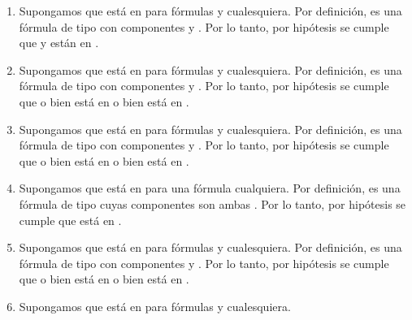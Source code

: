 \begin{isabellebody}
\begin{isamarkuptext}
\begin{demostracion}
  \begin{enumerate}
    \item[\isa{{\isadigit{3}}{\isacharparenright}}] Supongamos que  está en  para fórmulas  y  cualesquiera.
    Por definición,  es una fórmula de tipo \isa{{\isasymalpha}} con componentes  y . 
    Por lo tanto, por hipótesis se cumple que  y  están en .
    \item[\isa{{\isadigit{4}}{\isacharparenright}}] Supongamos que  está en  para fórmulas  y  cualesquiera.
    Por definición,  es una fórmula de tipo \isa{{\isasymbeta}} con componentes  y . 
    Por lo tanto, por hipótesis se cumple que o bien  está en  o bien  está 
    en .
    \item[\isa{{\isadigit{5}}{\isacharparenright}}] Supongamos que  está en  para fórmulas  y  cualesquiera.
    Por definición,  es una fórmula de tipo \isa{{\isasymbeta}} con componentes  y . 
    Por lo tanto, por hipótesis se cumple que o bien  está en  o bien  está 
    en .
    \item[\isa{{\isadigit{6}}{\isacharparenright}}] Supongamos que  está en  para una fórmula  cualquiera.
    Por definición,  es una fórmula de tipo \isa{{\isasymalpha}} cuyas componentes son ambas . 
    Por lo tanto, por hipótesis se cumple que  está en .
    \item[\isa{{\isadigit{7}}{\isacharparenright}}] Supongamos que  está en  para fórmulas  y  cualesquiera.
    Por definición,  es una fórmula de tipo \isa{{\isasymbeta}} con componentes  y . 
    Por lo tanto, por hipótesis se cumple que o bien  está en  o bien  está 
    en .
    \item[\isa{{\isadigit{8}}{\isacharparenright}}] Supongamos que  está en  para fórmulas  y  cualesquiera.

\end{enumerate}
\end{demostracion}
\end{isamarkuptext}
\end{isabellebody}
